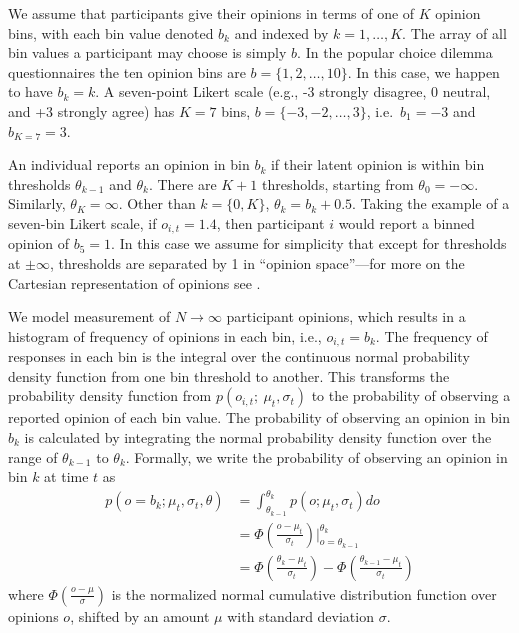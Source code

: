 We assume that participants give their opinions in terms of one of $K$ opinion
bins, with each bin value denoted $b_k$ and indexed by $k=1,\ldots,K$. 
The array of all bin values a participant may choose is 
simply $b$. In the popular choice dilemma questionnaires the
ten opinion bins are $b = \{1, 2, \ldots, 10\}$.
In this case, we happen to have $b_k = k$.
A seven-point Likert scale (e.g., -3 strongly disagree, 0 neutral, and +3 
strongly agree) has $K=7$ bins, $b = \{-3, -2,\ldots,3\}$, i.e.\ 
$b_1 = -3$ and $b_{K=7} = 3$.  

An individual reports an opinion in bin $b_k$ if their latent opinion is
within bin thresholds $\theta_{k-1}$ and $\theta_k$. There are
$K+1$ thresholds, starting from $\theta_0 = -\infty$. Similarly, $\theta_K = \infty$.
Other than $k=\{0,K\}$, $\theta_k = b_k + 0.5$. Taking the example of a seven-bin
Likert scale, if $o_{i,t} = 1.4$, then participant $i$ would report a 
binned opinion of $b_5 = 1$. In this case
we assume for simplicity that except for thresholds at $\pm \infty$, 
thresholds are separated by 1 in ``opinion space''---for more on 
the Cartesian representation of opinions see \citeA{Blau1974}.

We model measurement of $N \to \infty$ participant opinions,
which results in a histogram of frequency of opinions
in each bin, i.e., $o_{i,t} = b_k$. The frequency of responses in each bin is 
the integral over the continuous normal probability density function from 
one bin threshold to another. This transforms the probability density 
function from $p(o_{i,t};~\mu_t, \sigma_t)$ to the probability
of observing a reported opinion of each bin value. 
The probability of observing an opinion in bin
$b_k$ is calculated by integrating the normal probability density 
function over the range of $\theta_{k-1}$ to $\theta_{k}$. 
Formally, we write the 
probability of observing an opinion in bin $k$ at time $t$ as
\begin{equation}
\begin{aligned}
  p(o = b_k;\mu_t, \sigma_t, \theta) 
    &= \int_{\theta_{k-1}}^{\theta_k} p(o;\mu_t, \sigma_t) do \\
    &= \Phi \left( \frac{o - \mu_t}{\sigma_t} \right)\Big|_{o=\theta_{k-1}}^{\theta_k} \\
    &= \Phi \left( \frac{\theta_k - \mu_t}{\sigma_t} \right) - 
       \Phi \left( \frac{\theta_{k-1} - \mu_t}{\sigma_t} \right)
\end{aligned}
\label{eq:binFrequency}
\end{equation}
\noindent
where $\Phi(\frac{o - \mu}{\sigma})$ is the normalized 
normal cumulative distribution function over opinions $o$, shifted by an amount $\mu$ with
standard deviation $\sigma$.

